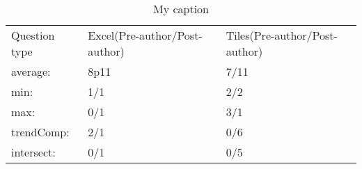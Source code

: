 \begin{table}[]
    \centering
        \caption{My caption}
        \label{my-label}
        \begin{tabular}{lll}
        Question type & Excel(Pre-author/Post-author) & Tiles(Pre-author/Post-author) \\
        average: & 8p11 & 7/11 \\
        min: & 1/1 & 2/2 \\
        max: & 0/1 & 3/1 \\
        trendComp: & 2/1 & 0/6 \\
        intersect: & 0/1 & 0/5
        \end{tabular}
\end{table}